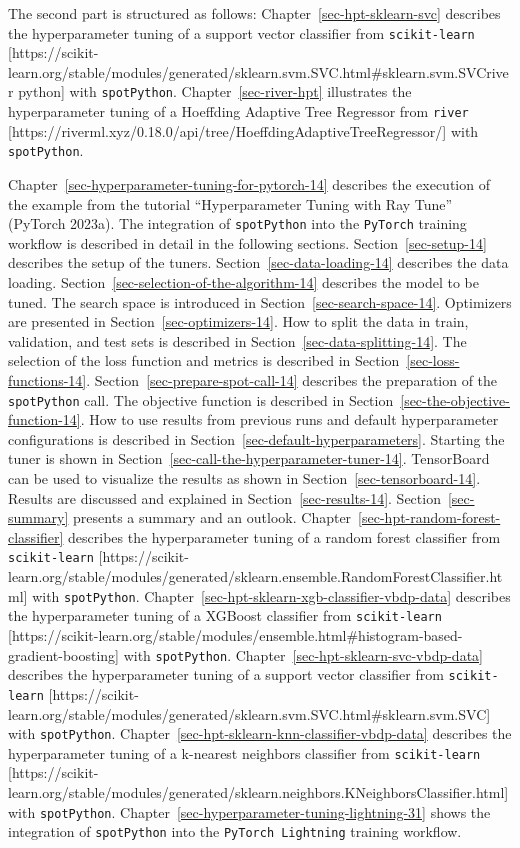 \documentclass[
  letterpaper,
  DIV=11,
  numbers=noendperiod]{scrreprt}
\begin{document}
The second part is structured as follows:
Chapter~\ref{sec-hpt-sklearn-svc} describes the hyperparameter tuning of
a support vector classifier from \texttt{scikit-learn}
{[}https://scikit-learn.org/stable/modules/generated/sklearn.svm.SVC.html\#sklearn.svm.SVCriver
python{]} with \texttt{spotPython}. Chapter~\ref{sec-river-hpt}
illustrates the hyperparameter tuning of a Hoeffding Adaptive Tree
Regressor from \texttt{river}
{[}https://riverml.xyz/0.18.0/api/tree/HoeffdingAdaptiveTreeRegressor/{]}
with \texttt{spotPython}.

Chapter~\ref{sec-hyperparameter-tuning-for-pytorch-14} describes the
execution of the example from the tutorial ``Hyperparameter Tuning with
Ray Tune'' (PyTorch 2023a). The integration of \texttt{spotPython} into
the \texttt{PyTorch} training workflow is described in detail in the
following sections. Section~\ref{sec-setup-14} describes the setup of
the tuners. Section~\ref{sec-data-loading-14} describes the data
loading. Section~\ref{sec-selection-of-the-algorithm-14} describes the
model to be tuned. The search space is introduced in
Section~\ref{sec-search-space-14}. Optimizers are presented in
Section~\ref{sec-optimizers-14}. How to split the data in train,
validation, and test sets is described in
Section~\ref{sec-data-splitting-14}. The selection of the loss function
and metrics is described in Section~\ref{sec-loss-functions-14}.
Section~\ref{sec-prepare-spot-call-14} describes the preparation of the
\texttt{spotPython} call. The objective function is described in
Section~\ref{sec-the-objective-function-14}. How to use results from
previous runs and default hyperparameter configurations is described in
Section~\ref{sec-default-hyperparameters}. Starting the tuner is shown
in Section~\ref{sec-call-the-hyperparameter-tuner-14}. TensorBoard can
be used to visualize the results as shown in
Section~\ref{sec-tensorboard-14}. Results are discussed and explained in
Section~\ref{sec-results-14}. Section~\ref{sec-summary} presents a
summary and an outlook. Chapter~\ref{sec-hpt-random-forest-classifier}
describes the hyperparameter tuning of a random forest classifier from
\texttt{scikit-learn}
{[}https://scikit-learn.org/stable/modules/generated/sklearn.ensemble.RandomForestClassifier.html{]}
with \texttt{spotPython}.
Chapter~\ref{sec-hpt-sklearn-xgb-classifier-vbdp-data} describes the
hyperparameter tuning of a XGBoost classifier from \texttt{scikit-learn}
{[}https://scikit-learn.org/stable/modules/ensemble.html\#histogram-based-gradient-boosting{]}
with \texttt{spotPython}. Chapter~\ref{sec-hpt-sklearn-svc-vbdp-data}
describes the hyperparameter tuning of a support vector classifier from
\texttt{scikit-learn}
{[}https://scikit-learn.org/stable/modules/generated/sklearn.svm.SVC.html\#sklearn.svm.SVC{]}
with \texttt{spotPython}.
Chapter~\ref{sec-hpt-sklearn-knn-classifier-vbdp-data} describes the
hyperparameter tuning of a k-nearest neighbors classifier from
\texttt{scikit-learn}
{[}https://scikit-learn.org/stable/modules/generated/sklearn.neighbors.KNeighborsClassifier.html{]}
with \texttt{spotPython}.
Chapter~\ref{sec-hyperparameter-tuning-lightning-31} shows the
integration of \texttt{spotPython} into the \texttt{PyTorch\ Lightning}
training workflow.
\end{document}
